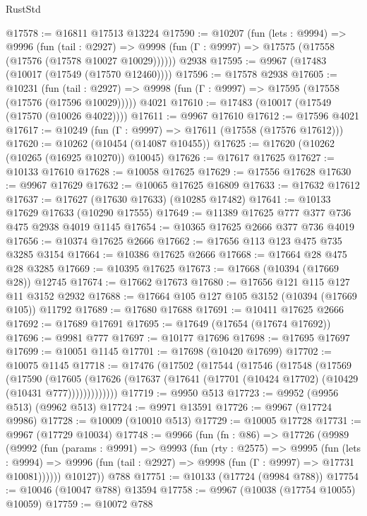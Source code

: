 \begin{lexlean}{RustStd}
\begin{coremodule}
@17578 := @16811 @17513 @13224
@17590 := @10207
    (fun (lets : @9994) =>
    @9996
      (fun (tail : @2927) =>
      @9998 (fun (Γ : @9997) => @17575 (@17558 (@17576 (@17578 @10027 @10029))))))
    @2938
@17595 := @9967 (@17483 (@10017 (@17549 (@17570 @12460))))
@17596 := @17578 @2938
@17605 := @10231
    (fun (tail : @2927) => @9998 (fun (Γ : @9997) => @17595 (@17558 (@17576 (@17596 @10029)))))
    @4021
@17610 := @17483 (@10017 (@17549 (@17570 (@10026 @4022))))
@17611 := @9967 @17610
@17612 := @17596 @4021
@17617 := @10249 (fun (Γ : @9997) => @17611 (@17558 (@17576 @17612)))
@17620 := @10262 (@10454 (@14087 @10455))
@17625 := @17620 (@10262 (@10265 (@16925 @10270)) @10045)
@17626 := @17617 @17625
@17627 := @10133 @17610
@17628 := @10058 @17625
@17629 := @17556 @17628
@17630 := @9967 @17629
@17632 := @10065 @17625 @16809
@17633 := @17632 @17612
@17637 := @17627 (@17630 @17633) (@10285 @17482)
@17641 := @10133 @17629 @17633 (@10290 @17555)
@17649 := @11389 @17625 @777 @377 @736 @475 @2938 @4019 @1145
@17654 := @10365 @17625 @2666 @377 @736 @4019
@17656 := @10374 @17625 @2666
@17662 := @17656 @113 @123 @475 @735 @3285 @3154
@17664 := @10386 @17625 @2666
@17668 := @17664 @28 @475 @28 @3285
@17669 := @10395 @17625
@17673 := @17668 (@10394 (@17669 @28)) @12745
@17674 := @17662 @17673
@17680 := @17656 @121 @115 @127 @11 @3152 @2932
@17688 := @17664 @105 @127 @105 @3152 (@10394 (@17669 @105)) @11792
@17689 := @17680 @17688
@17691 := @10411 @17625 @2666
@17692 := @17689 @17691
@17695 := @17649 (@17654 (@17674 @17692))
@17696 := @9981 @777
@17697 := @10177 @17696
@17698 := @17695 @17697
@17699 := @10051 @1145
@17701 := @17698 (@10420 @17699)
@17702 := @10075 @1145
@17718 := @17476
    (@17502
      (@17544
        (@17546
          (@17548
            (@17569
              (@17590
                (@17605
                  (@17626 (@17637 (@17641 (@17701 (@10424 @17702) (@10429 (@10431 @777)))))))))))))
@17719 := @9950 @513
@17723 := @9952 (@9956 @513) (@9962 @513)
@17724 := @9971 @13591
@17726 := @9967 (@17724 @9986)
@17728 := @10009 (@10010 @513)
@17729 := @10005 @17728
@17731 := @9967 (@17729 @10034)
@17748 := @9966
    (fun (fn : @86) =>
    @17726
      (@9989
        (@9992
          (fun (params : @9991) =>
          @9993
            (fun (rty : @2575) =>
            @9995
              (fun (lets : @9994) =>
              @9996 (fun (tail : @2927) => @9998 (fun (Γ : @9997) => @17731 @10081))))))
        @10127))
    @788
@17751 := @10133 (@17724 (@9984 @788))
@17754 := @10046 (@10047 @788) @13594
@17758 := @9967 (@10038 (@17754 @10055) @10059)
@17759 := @10072 @788

\end{coremodule}
\end{lexlean}
